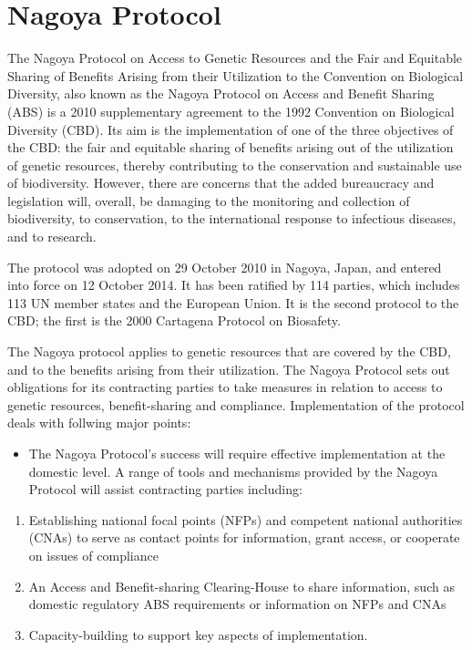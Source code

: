 \documentclass[
]{book}
\providecommand{\tightlist}{%
  \setlength{\itemsep}{0pt}\setlength{\parskip}{0pt}}
\begin{document}
\hypertarget{nagoya-protocol}{%
\section{Nagoya Protocol}\label{nagoya-protocol}}

The Nagoya Protocol on Access to Genetic Resources and the Fair and Equitable Sharing of Benefits Arising from their Utilization to the Convention on Biological Diversity, also known as the Nagoya Protocol on Access and Benefit Sharing (ABS) is a 2010 supplementary agreement to the 1992 Convention on Biological Diversity (CBD). Its aim is the implementation of one of the three objectives of the CBD: the fair and equitable sharing of benefits arising out of the utilization of genetic resources, thereby contributing to the conservation and sustainable use of biodiversity. However, there are concerns that the added bureaucracy and legislation will, overall, be damaging to the monitoring and collection of biodiversity, to conservation, to the international response to infectious diseases, and to research.

The protocol was adopted on 29 October 2010 in Nagoya, Japan, and entered into force on 12 October 2014. It has been ratified by 114 parties, which includes 113 UN member states and the European Union. It is the second protocol to the CBD; the first is the 2000 Cartagena Protocol on Biosafety.

The Nagoya protocol applies to genetic resources that are covered by the CBD, and to the benefits arising from their utilization. The Nagoya Protocol sets out obligations for its contracting parties to take measures in relation to access to genetic resources, benefit-sharing and compliance. Implementation of the protocol deals with follwing major points:

\begin{itemize}
\tightlist
\item
  The Nagoya Protocol's success will require effective implementation at the domestic level. A range of tools and mechanisms provided by the Nagoya Protocol will assist contracting parties including:
\end{itemize}

\begin{enumerate}
\def\labelenumi{\arabic{enumi}.}
\tightlist
\item
  Establishing national focal points (NFPs) and competent national authorities (CNAs) to serve as contact points for information, grant access, or cooperate on issues of compliance
\item
  An Access and Benefit-sharing Clearing-House to share information, such as domestic regulatory ABS requirements or information on NFPs and CNAs
\item
  Capacity-building to support key aspects of implementation.
\end{enumerate}
\end{document}
